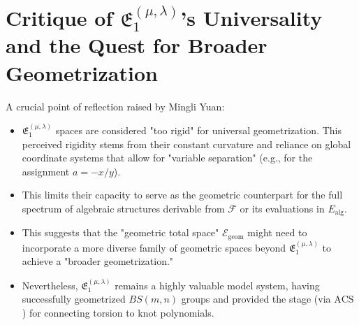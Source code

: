 \documentclass{article}[a4paper,12pt]
\begin{document}
\section{Critique of $\mathfrak{E}_1^{(\mu,\lambda)}$'s Universality and the Quest for Broader Geometrization}
A crucial point of reflection raised by Mingli Yuan:
\begin{itemize}
    \item $\mathfrak{E}_1^{(\mu,\lambda)}$ spaces are considered "too rigid" for universal geometrization. This perceived rigidity stems from their constant curvature and reliance on global coordinate systems that allow for "variable separation" (e.g., for the assignment $a=-x/y$).
    \item This limits their capacity to serve as the geometric counterpart for the full spectrum of algebraic structures derivable from $\mathcal{F}$ or its evaluations in $E_{\text{alg}}$.
    \item This suggests that the "geometric total space" $\mathcal{E}_{\text{geom}}$ might need to incorporate a more diverse family of geometric spaces beyond $\mathfrak{E}_1^{(\mu,\lambda)}$ to achieve a "broader geometrization."
    \item Nevertheless, $\mathfrak{E}_1^{(\mu,\lambda)}$ remains a highly valuable model system, having successfully geometrized $BS(m,n)$ groups and provided the stage (via $\mathrm{ACS}$) for connecting torsion to knot polynomials.
\end{itemize}
\end{document}
